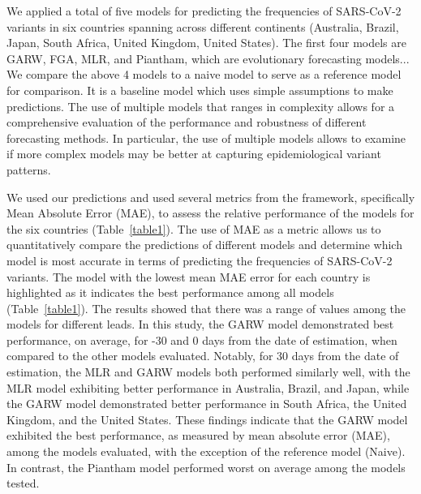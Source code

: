 \documentclass[11pt,oneside,letterpaper]{article}
\begin{document}
We applied a total of five models for predicting the frequencies of SARS-CoV-2 variants in six countries spanning across different continents (Australia, Brazil, Japan, South Africa, United Kingdom, United States).
The first four models are GARW, FGA, MLR, and Piantham, which are evolutionary forecasting models... %
We compare the above 4 models to a naive model to serve as a reference model for comparison.
It is a baseline model which uses simple assumptions to make predictions. 
The use of multiple models that ranges in complexity allows for a comprehensive evaluation of the performance and robustness of different forecasting methods.
In particular, the use of multiple models allows to examine if more complex models may be better at capturing epidemiological variant patterns. 



We used our predictions and used several metrics from the framework, specifically Mean Absolute Error (MAE), to assess the relative performance of the models for the six countries (Table~\ref{table1}).
The use of MAE as a metric allows us to quantitatively compare the predictions of different models and determine which model is most accurate in terms of predicting the frequencies of SARS-CoV-2 variants.
The model with the lowest mean MAE error for each country is highlighted as it indicates the best performance among all models (Table~\ref{table1}). 
The results showed that there was a range of values among the models for different leads.
In this study, the GARW model demonstrated best performance, on average, for -30 and 0 days from the date of estimation, when compared to the other models evaluated. 
Notably, for 30 days from the date of estimation, the MLR and GARW models both performed similarly well, with the MLR model exhibiting better performance in Australia, Brazil, and Japan, while the GARW model demonstrated better performance in South Africa, the United Kingdom, and the United States.
These findings indicate that the GARW model exhibited the best performance, as measured by mean absolute error (MAE), among the models evaluated, with the exception of the reference model (Naive).
In contrast, the Piantham model performed worst on average among the models tested.
\end{document}
